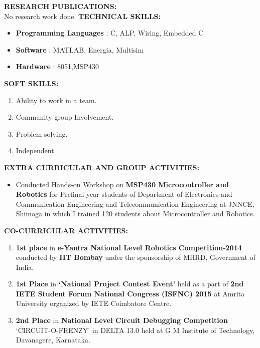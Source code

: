 \documentclass{article}
\begin{document}
\textbf{RESEARCH PUBLICATIONS:}\\
  No research work done. \newline \newline
\textbf{TECHNICAL SKILLS:}
\begin{itemize}
	\item \textbf{Programming Languages} : C, ALP, Wiring, Embedded C
	\item \textbf{Software}			 \hspace{2.7cm}	: MATLAB, Energia, Multisim 
	\item \textbf{Hardware}			 \hspace{2.5cm}	: 8051,MSP430
\newline
\end{itemize}

\textbf{SOFT SKILLS:}
\begin{enumerate}
	\item Ability to work in a team. 
	\item Community group Involvement.
	\item Problem solving.
	\item Independent \newline
\end{enumerate}

\textbf{EXTRA CURRICULAR AND GROUP ACTIVITIES:}
\begin{itemize}
\item Conducted Hands-on Workshop on \textbf{MSP430 Microcontroller and Robotics} for Prefinal year students of Department of Electronics and Communication Engineering and
Telecommunication Engineering at JNNCE, Shimoga in which I trained 120 students
about Microcontroller and Robotics.\newline
\end{itemize}

\textbf{CO-CURRICULAR ACTIVITIES:}
\begin{enumerate}
	\item \textbf{1st  place} in \textbf{e-Yantra National Level Robotics Competition-2014} conducted by \textbf{IIT Bombay} under the sponsorship of MHRD, Government of India.
	\item \textbf{1st Place} in \textbf{‘National Project Contest Event’} held as a part of \textbf{2nd IETE Student Forum National Congress (ISFNC) 2015} at Amrita University organized by IETE Coimbatore Centre. 
	\item 	\textbf{2nd Place} in \textbf{National Level Circuit Debugging Competition} ‘CIRCUIT-O-FRENZY’ in DELTA 13.0 held at G M Institute of Technology, Davanagere, Karnataka.\newline
	
\end{enumerate}
\end{document}

